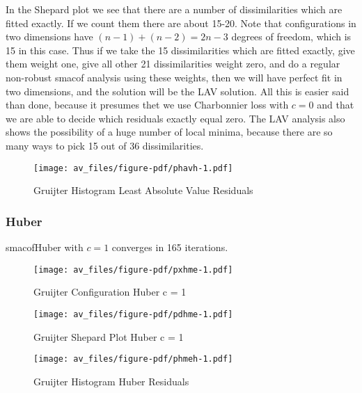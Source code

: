 \documentclass[
  12pt,
  letterpaper,
  DIV=11,
  numbers=noendperiod]{scrartcl}
\theoremstyle{plain}
\theoremstyle{plain}
\theoremstyle{plain}
\theoremstyle{definition}
\theoremstyle{remark}
\begin{document}
In the Shepard plot we see that there are a number of dissimilarities
which are fitted exactly. If we count them there are about 15-20. Note
that configurations in two dimensions have \((n-1)+(n-2)=2n-3\) degrees
of freedom, which is 15 in this case. Thus if we take the 15
dissimilarities which are fitted exactly, give them weight one, give all
other 21 dissimilarities weight zero, and do a regular non-robust smacof
analysis using these weights, then we will have perfect fit in two
dimensions, and the solution will be the LAV solution. All this is
easier said than done, because it presumes thet we use Charbonnier loss
with \(c=0\) and that we are able to decide which residuals exactly
equal zero. The LAV analysis also shows the possibility of a huge number
of local minima, because there are so many ways to pick 15 out of 36
dissimilarities.

\begin{figure}[H]

{\centering \texttt{[image: av\_files/figure-pdf/phavh-1.pdf]}

}

\caption{Gruijter Histogram Least Absolute Value Residuals}

\end{figure}%

\subsubsection{Huber}\label{huber-1}

smacofHuber with \(c=1\) converges in 165 iterations.

\begin{figure}[H]

{\centering \texttt{[image: av\_files/figure-pdf/pxhme-1.pdf]}

}

\caption{Gruijter Configuration Huber c = 1}

\end{figure}%

\begin{figure}[H]

{\centering \texttt{[image: av\_files/figure-pdf/pdhme-1.pdf]}

}

\caption{Gruijter Shepard Plot Huber c = 1}

\end{figure}%

\begin{figure}[H]

{\centering \texttt{[image: av\_files/figure-pdf/phmeh-1.pdf]}

}

\caption{Gruijter Histogram Huber Residuals}

\end{figure}%
\end{document}
